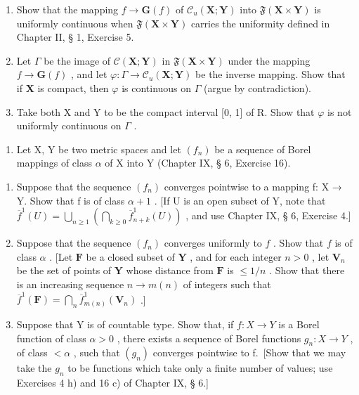 \begin{enumerate}
\def\labelenumi{\alph{enumi})}
\item
  Show that the mapping \(f \to \mathbf{G}(f)\) of \(\mathcal{C}_u(\mathbf{X};\mathbf{Y})\) into \(\mathfrak{F}(\mathbf{X}\times \mathbf{Y})\) is uniformly continuous when \(\mathfrak{F}(\mathbf{X}\times \mathbf{Y})\) carries the uniformity defined in Chapter II, § 1, Exercise 5.
\item
  Let \(\Gamma\) be the image of \(\mathcal{C}(\mathbf{X};\mathbf{Y})\) in \(\mathfrak{F}(\mathbf{X}\times \mathbf{Y})\) under the mapping \(f\to \mathbf{G}(f)\) , and let \(\varphi :\Gamma \to \mathcal{C}_u(\mathbf{X};\mathbf{Y})\) be the inverse mapping. Show that if \(\mathbf{X}\) is compact, then \(\varphi\) is continuous on \(\Gamma\) (argue by contradiction).
\item
  Take both X and Y to be the compact interval {[}0, 1{]} of R. Show that \(\varphi\) is not uniformly continuous on \(\Gamma\) .
\end{enumerate}

\begin{enumerate}
\def\labelenumi{\arabic{enumi})}
\setcounter{enumi}{7}
\tightlist
\item
  Let X, Y be two metric spaces and let \((f_{n})\) be a sequence of Borel mappings of class \(\alpha\) of X into Y (Chapter IX, § 6, Exercise 16).
\end{enumerate}

\begin{enumerate}
\def\labelenumi{\alph{enumi})}
\item
  Suppose that the sequence \((f_{n})\) converges pointwise to a mapping f: X → Y. Show that f is of class \(\alpha + 1\) . {[}If U is an open subset of Y, note that \(\overline{f}^{1}(U) = \bigcup_{n \geqslant 1} \left( \bigcap_{k \geqslant 0} \overline{f}_{n+k}^{1}(U) \right)\) , and use Chapter IX, § 6, Exercise 4.{]}
\item
  Suppose that the sequence \((f_n)\) converges uniformly to \(f\) . Show that \(f\) is of class \(\alpha\) . {[}Let \(\mathbf{F}\) be a closed subset of \(\mathbf{Y}\) , and for each integer \(n > 0\) , let \(\mathbf{V}_n\) be the set of points of \(\mathbf{Y}\) whose distance from \(\mathbf{F}\) is \(\leqslant 1/n\) . Show that there is an increasing sequence \(n \to m(n)\) of integers such that \(\overline{f}^1(\mathbf{F}) = \bigcap_{n} \overline{f}_{m(n)}^1(\mathbf{V}_n)\) .{]}
\item
  Suppose that Y is of countable type. Show that, if \(f: X \to Y\) is a Borel function of class \(\alpha > 0\) , there exists a sequence of Borel functions \(g_{n}: X \to Y\) , of class \(<\alpha\) , such that \((g_{n})\) converges pointwise to f.~{[}Show that we may take the \(g_{n}\) to be functions which take only a finite number of values; use Exercises 4 h) and 16 c) of Chapter IX, § 6.{]}
\end{enumerate}

